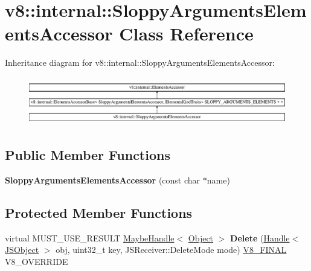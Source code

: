 \hypertarget{classv8_1_1internal_1_1_sloppy_arguments_elements_accessor}{}\section{v8\+:\+:internal\+:\+:Sloppy\+Arguments\+Elements\+Accessor Class Reference}
\label{classv8_1_1internal_1_1_sloppy_arguments_elements_accessor}
Inheritance diagram for v8\+:\+:internal\+:\+:Sloppy\+Arguments\+Elements\+Accessor\+:\begin{figure}[H]
\begin{center}
\leavevmode
\includegraphics[height=2.118537cm]{classv8_1_1internal_1_1_sloppy_arguments_elements_accessor}
\end{center}
\end{figure}
\subsection*{Public Member Functions}
\begin{DoxyCompactItemize}
\item 
\hypertarget{classv8_1_1internal_1_1_sloppy_arguments_elements_accessor_a1a716af424473a8997063d3f00ab237b}{}{\bfseries Sloppy\+Arguments\+Elements\+Accessor} (const char $\ast$name)\label{classv8_1_1internal_1_1_sloppy_arguments_elements_accessor_a1a716af424473a8997063d3f00ab237b}

\end{DoxyCompactItemize}
\subsection*{Protected Member Functions}
\begin{DoxyCompactItemize}
\item 
\hypertarget{classv8_1_1internal_1_1_sloppy_arguments_elements_accessor_aec4b04f51144600597754d53101e4f34}{}virtual M\+U\+S\+T\+\_\+\+U\+S\+E\+\_\+\+R\+E\+S\+U\+L\+T \hyperlink{classv8_1_1internal_1_1_maybe_handle}{Maybe\+Handle}$<$ \hyperlink{classv8_1_1internal_1_1_object}{Object} $>$ {\bfseries Delete} (\hyperlink{classv8_1_1internal_1_1_handle}{Handle}$<$ \hyperlink{classv8_1_1internal_1_1_j_s_object}{J\+S\+Object} $>$ obj, uint32\+\_\+t key, J\+S\+Receiver\+::\+Delete\+Mode mode) \hyperlink{classv8_1_1internal_1_1_v8___f_i_n_a_l}{V8\+\_\+\+F\+I\+N\+A\+L} V8\+\_\+\+O\+V\+E\+R\+R\+I\+D\+E\label{classv8_1_1internal_1_1_sloppy_arguments_elements_accessor_aec4b04f51144600597754d53101e4f34}

\end{DoxyCompactItemize}
